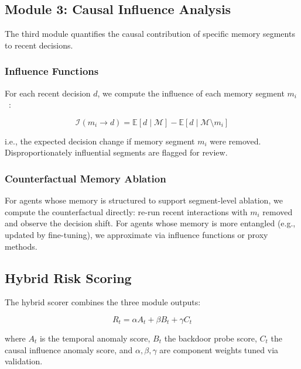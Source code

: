 \documentclass[sigconf,nonacm]{acmart}
\begin{document}
\subsection{Module 3: Causal Influence Analysis}

The third module quantifies the causal contribution of specific
memory segments to recent decisions.

\subsubsection{Influence Functions}

For each recent decision $d$, we compute the influence of each
memory segment $m_i$~\cite{koh2017influence,park2024dataattribution}:

\begin{equation}
  \mathcal{I}(m_i \to d) = \mathbb{E}[d \mid \mathcal{M}] - \mathbb{E}[d \mid \mathcal{M} \setminus m_i]
\end{equation}

i.e., the expected decision change if memory segment $m_i$ were
removed. Disproportionately influential segments are flagged for
review.

\subsubsection{Counterfactual Memory Ablation}

For agents whose memory is structured to support segment-level
ablation, we compute the counterfactual directly: re-run recent
interactions with $m_i$ removed and observe the decision shift.
For agents whose memory is more entangled (e.g., updated by
fine-tuning), we approximate via influence functions or proxy
methods.

\subsection{Hybrid Risk Scoring}

The hybrid scorer combines the three module outputs:

\begin{equation}
  R_t = \alpha A_t + \beta B_t + \gamma C_t
\end{equation}

where $A_t$ is the temporal anomaly score, $B_t$ the backdoor probe
score, $C_t$ the causal influence anomaly score, and
$\alpha, \beta, \gamma$ are component weights tuned via validation.
\end{document}
